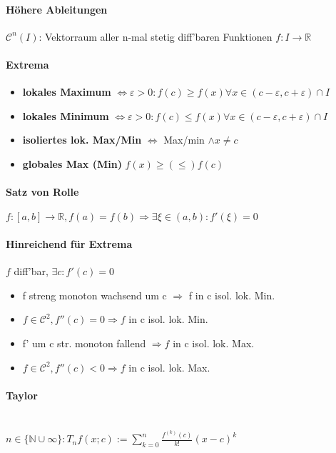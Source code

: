 \documentclass[paper=a3,paper=landscape, fontsize=9pt,DIV=25]{scrartcl}
\newcommand{\real}{{\mathbb{R}}}
\newcommand{\nat}{\mathbb{N}}
\begin{document}
\begin{multicols*}{4}
  \paragraph{Höhere Ableitungen}
  $\mathscr{C}^n(I)$: Vektorraum aller n-mal stetig diff'baren Funktionen $f: I \rightarrow \real$


  \paragraph{Extrema}
  \begin{itemize}
  \item \textbf{lokales Maximum} $\Leftrightarrow \varepsilon > 0: f(c) \geq f(x) \forall x \in (c-\varepsilon,c+\varepsilon)\cap I$
  \item \textbf{lokales Minimum} $\Leftrightarrow \varepsilon > 0: f(c) \leq f(x) \forall x \in (c-\varepsilon,c+\varepsilon)\cap I$
  \item \textbf{isoliertes lok. Max/Min} $\Leftrightarrow$ Max/min $\wedge x \neq c$
  \item \textbf{globales Max (Min)} $f(x) \geq (\leq) f(c)$
  \end{itemize}


  \paragraph{Satz von Rolle}
  $f: [a,b] \rightarrow \real, f(a)=f(b) \Rightarrow \exists \xi \in (a,b): f'(\xi)=0$


  \paragraph{Hinreichend für Extrema}
  $f$ diff'bar, $\exists c: f'(c)=0$
  \begin{itemize}
  \item f streng monoton wachsend um c $\Rightarrow$ f in c isol. lok. Min.
  \item $f \in \mathscr{C}^2, f''(c)=0 \Rightarrow f$ in c isol. lok. Min.
  \item f' um c str. monoton fallend $\Rightarrow f$ in c isol. lok. Max.
  \item $f \in \mathscr{C}^2, f''(c)<0 \Rightarrow f$ in c isol. lok. Max.
  \end{itemize}


  \paragraph{Taylor}\hspace{0pt} \\
  $ n \in \{\nat \cup \infty\}: T_nf(x;c):= \sum_{k=0}^{n}\frac{f^{(k)}(c)}{k!}(x-c)^k$

\end{multicols*}
\end{document}
